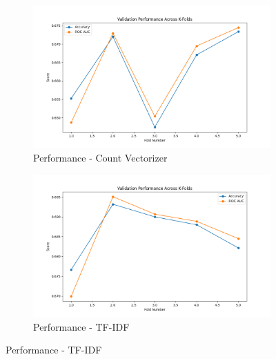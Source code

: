 \begin{figure}[H]
    \centering
    \begin{subfigure}[b]{0.48\textwidth}
        \includegraphics[width=\textwidth]{img/report_info/img/2.1.Perceptron/best_perceptron_count.png}
        \caption{Performance - Count Vectorizer}
        \label{fig:perc-count}
    \end{subfigure}
    \begin{subfigure}[b]{0.48\textwidth}
        \includegraphics[width=\textwidth]{img/report_info/img/2.1.Perceptron/best_perceptron_tfidf.png}
        \caption{Performance - TF-IDF}
        \label{fig:perc-tfidf}
    \end{subfigure}
    

\end{figure}
